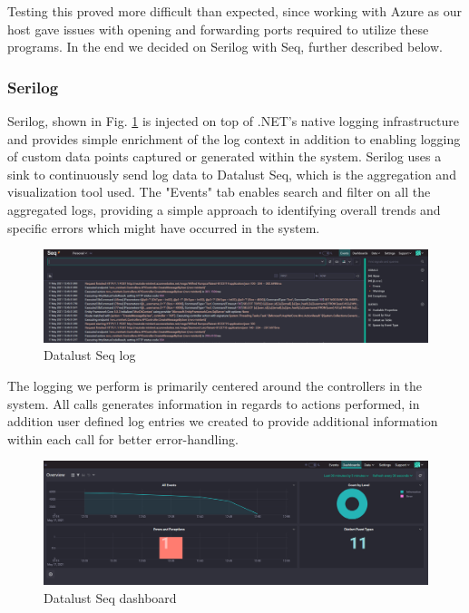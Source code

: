 \documentclass{article}
\begin{document}
Testing this proved more difficult than expected, since working with Azure as our host gave issues with opening and forwarding ports required to utilize these programs.
In the end we decided on Serilog with Seq, further described below.

\subsubsection{Serilog}
Serilog, shown in Fig. \ref{fig:seqlog}  is injected on top of .NET's native logging infrastructure and provides simple enrichment of the log context in addition to enabling logging of custom data points captured or generated within the system.
Serilog uses a sink to continuously send log data to Datalust Seq, which is the aggregation and visualization tool used.
The "Events" tab enables search and filter on all the aggregated logs, providing a simple approach to identifying overall trends and specific errors which might have occurred in the system.

\begin{figure}[H]
\centering
\includegraphics[width=1\textwidth]{images/DatalustSeq.PNG}
\caption{\label{fig:seqlog} Datalust Seq log}
\end{figure}

The logging we perform is primarily centered around the controllers in the system. All calls generates information in regards to actions performed, in addition user defined log entries we created to provide additional information within each call for better error-handling.

\begin{figure}[H]
\centering
\includegraphics[width=1\textwidth]{images/DatalustSeq2.PNG}
\caption{\label{fig:seqdashboard} Datalust Seq dashboard}
\end{figure}
\end{document}
